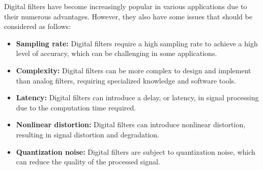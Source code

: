 Digital filters have become increasingly popular in various applications due to their numerous advantages. However, they also have some issues that should be considered as follows:\\
\begin{itemize}
	\item \textbf{Sampling rate: }Digital filters require a high sampling rate to achieve a high level of accuracy, which can be challenging in some applications.
	\item \textbf{Complexity: }Digital filters can be more complex to design and implement than analog filters, requiring specialized knowledge and software tools.
	\item \textbf{Latency: }Digital filters can introduce a delay, or latency, in signal processing due to the computation time required.
	\item \textbf{Nonlinear distortion: }Digital filters can introduce nonlinear distortion, resulting in signal distortion and degradation.
	\item \textbf{Quantization noise: }Digital filters are subject to quantization noise, which can reduce the quality of the processed signal.
\end{itemize}